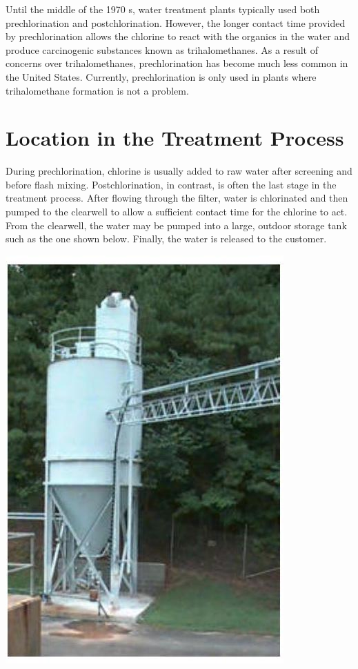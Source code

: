 \documentclass[10pt]{article}
\begin{document}
Until the middle of the 1970 s, water treatment plants typically used both prechlorination and postchlorination. However, the longer contact time provided by prechlorination allows the chlorine to react with the organics in the water and produce carcinogenic substances known as trihalomethanes. As a result of concerns over trihalomethanes, prechlorination has become much less common in the United States. Currently, prechlorination is only used in plants where trihalomethane formation is not a problem.

\section{Location in the Treatment Process}
During prechlorination, chlorine is usually added to raw water after screening and before flash mixing. Postchlorination, in contrast, is often the last stage in the treatment process. After flowing through the filter, water is chlorinated and then pumped to the clearwell to allow a sufficient contact time for the chlorine to act. From the clearwell, the water may be pumped into a large, outdoor storage tank such as the one shown below. Finally, the water is released to the customer.

\includegraphics[max width=\textwidth]{2022_10_14_eba0aec33b37be0fbdf2g-10}
\end{document}
